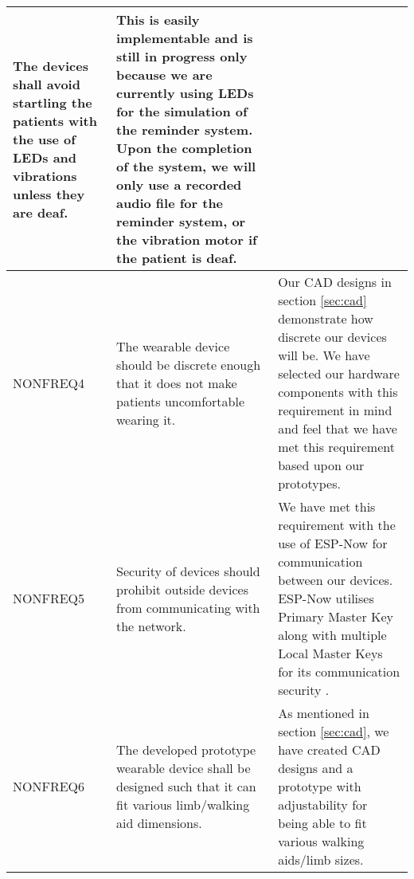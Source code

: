 \begin{xltabular}[H]{1.4\textwidth}{p{0.2\textwidth} | p{0.5\textwidth} | p{0.8\textwidth}}
        The devices shall avoid startling the patients with the use of LEDs and vibrations unless they are deaf.

        &

        This is easily implementable and is still in progress only because we are currently using LEDs for the simulation of the reminder system. Upon the completion of the system, we will only use a recorded audio file for the reminder system, or the vibration motor if the patient is deaf.\\

        \midrule

        NONFREQ4

        &

        The wearable device should be discrete enough that it does not make patients uncomfortable wearing it.

        &

        Our CAD designs in section \ref{sec:cad} demonstrate how discrete our devices will be. We have selected our hardware components with this requirement in mind and feel that we have met this requirement based upon our prototypes.\\

        \midrule

        NONFREQ5

        &

        Security of devices should prohibit outside devices from communicating with the network.

        &

        We have met this requirement with the use of ESP-Now for communication between our devices. ESP-Now utilises Primary Master Key along with multiple Local Master Keys for its communication security \cite{esp}.\\

		\midrule

        NONFREQ6

        &

        The developed prototype wearable device shall be designed such that it can fit various limb/walking aid dimensions.

        &

        As mentioned in section \ref{sec:cad}, we have created CAD designs and a prototype with adjustability for being able to fit various walking aids/limb sizes.\\

		\midrule


\end{xltabular}
